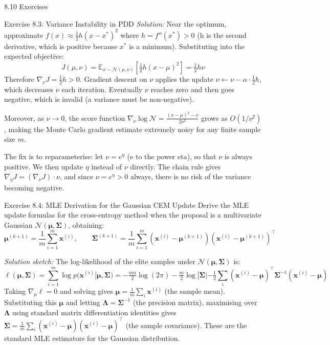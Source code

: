 \documentclass[aspectratio=169,10pt]{beamer}
\begin{document}
\begin{frame}[allowframebreaks]{8.10 Exercises}
\begin{block}{Exercise 8.3: Variance Instability in PDD}
\medskip
\textit{Solution:} Near the optimum, approximate $f(x) \approx \frac{1}{2}h(x-x^*)^2$ where $h = f''(x^*) > 0$ (h is the second derivative, which is positive because $x^*$ is a minimum). Substituting into the expected objective:
\[
  J(\mu, \nu) = \mathbb{E}_{x \sim \mathcal{N}(\mu,\nu)}\!\left[\tfrac{1}{2}h(x-\mu)^2\right] = \tfrac{1}{2}h\nu
\]
Therefore $\nabla_\nu J = \tfrac{1}{2}h > 0$. Gradient descent on $\nu$ applies the update $\nu \leftarrow \nu - \alpha \cdot \tfrac{1}{2}h$, which decreases $\nu$ each iteration. Eventually $\nu$ reaches zero and then goes negative, which is invalid (a variance must be non-negative).

Moreover, as $\nu \to 0$, the score function $\nabla_\nu \log \mathcal{N} = \frac{(x-\mu)^2 - \nu}{2\nu^2}$ grows as $O(1/\nu^2)$, making the Monte Carlo gradient estimate extremely noisy for any finite sample size $m$.

The fix is to reparameterise: let $\nu = e^\eta$ (e to the power eta), so that $\nu$ is always positive. We then update $\eta$ instead of $\nu$ directly. The chain rule gives $\nabla_\eta J = (\nabla_\nu J) \cdot \nu$, and since $\nu = e^\eta > 0$ always, there is no risk of the variance becoming negative.
\end{block}

\begin{block}{Exercise 8.4: MLE Derivation for the Gaussian CEM Update}
Derive the MLE update formulas for the cross-entropy method when the proposal is a multivariate Gaussian $\mathcal{N}(\bm{\mu}, \bm{\Sigma})$, obtaining:
\[
  \bm{\mu}^{(k+1)} = \frac{1}{m}\sum_{i=1}^{m} \mathbf{x}^{(i)}, \qquad
  \bm{\Sigma}^{(k+1)} = \frac{1}{m}\sum_{i=1}^{m}\!\left(\mathbf{x}^{(i)}-\bm{\mu}^{(k+1)}\right)\!\left(\mathbf{x}^{(i)}-\bm{\mu}^{(k+1)}\right)^\top
\]

\medskip
\textit{Solution sketch:} The log-likelihood of the elite samples under $\mathcal{N}(\bm{\mu}, \bm{\Sigma})$ is:
\[
  \ell(\bm{\mu}, \bm{\Sigma}) = \sum_{i=1}^{m} \log p(\mathbf{x}^{(i)} | \bm{\mu}, \bm{\Sigma})
  = -\tfrac{mn}{2}\log(2\pi) - \tfrac{m}{2}\log|\bm{\Sigma}| - \tfrac{1}{2}\sum_i (\mathbf{x}^{(i)}-\bm{\mu})^\top \bm{\Sigma}^{-1}(\mathbf{x}^{(i)}-\bm{\mu})
\]
Taking $\nabla_\mu \ell = 0$ and solving gives $\bm{\mu} = \frac{1}{m}\sum_i \mathbf{x}^{(i)}$ (the sample mean). Substituting this $\bm{\mu}$ and letting $\bm{\Lambda} = \bm{\Sigma}^{-1}$ (the precision matrix), maximising over $\bm{\Lambda}$ using standard matrix differentiation identities gives $\bm{\Sigma} = \frac{1}{m}\sum_i (\mathbf{x}^{(i)}-\bm{\mu})(\mathbf{x}^{(i)}-\bm{\mu})^\top$ (the sample covariance). These are the standard MLE estimators for the Gaussian distribution.
\end{block}

\end{frame}
\end{document}
